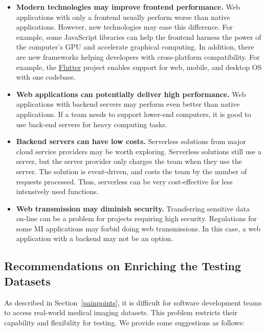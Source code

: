 \documentclass[final, 3p, times, authoryear]{elsarticle}
\begin{document}
\begin{itemize}

\item \textbf{Modern technologies may improve frontend performance.} Web
applications with only a frontend usually perform worse than native
applications. However, new technologies may ease this difference. For example,
some JavaScript libraries can help the frontend harness the power of the
computer's GPU and accelerate graphical computing. In addition, there are new
frameworks helping developers with cross-platform compatibility. For example,
the \href{https://flutter.dev/}{Flutter} project enables support for web,
mobile, and desktop OS with one codebase.

\item \textbf{Web applications can potentially deliver high performance.} Web
applications with backend servers may perform even better than native
applications. If a team needs to support lower-end computers, it is good to use
back-end servers for heavy computing tasks.

\item \textbf{Backend servers can have low costs.} Serverless solutions from
major cloud service providers may be worth exploring. Serverless solutions still
use a server, but the server provider only charges the team when they use the
server. The solution is event-driven, and costs the team by the number of
requests processed. Thus, serverless can be very cost-effective for less
intensively used functions.

\item \textbf{Web transmission may diminish security.} Transferring sensitive
data on-line can be a problem for projects requiring high security. Regulations
for some MI applications may forbid doing web transmissions. In this case, a web
application with a backend may not be an option.

\end{itemize}

\subsection{Recommendations on Enriching the Testing Datasets} 
\label{sec_recommendations_testing_dataset}

As described in Section~\ref{painpoints}, it is difficult for software
development teams to access real-world medical imaging datasets. This problem
restricts their capability and flexibility for testing. We provide some
suggestions as follows:
\end{document}
